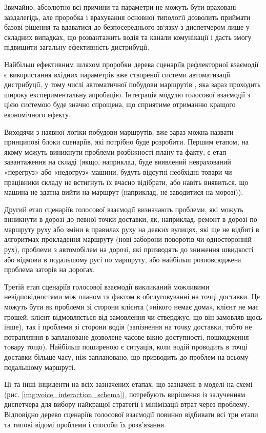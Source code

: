Звичайно, абсолютно всі причини та параметри не можуть бути враховані заздалегідь, але проробка і врахування основної типології дозволить приймати базові рішення та вдаватися до безпосереднього зв`язку з диспетчером лише у складних випадках, що розвантажить водія та канали комунікації і дасть змогу підвищити загальну ефективність дистрибуції.

Найбільш ефективним шляхом проробки дерева сценаріїв рефлекторної взаємодії є використання вхідних параметрів вже створеної системи автоматизації дистрибуції, у тому числі автоматичної побудови маршрутів \cite{as6}, яка зараз проходить широку експериментальну апробацію. Інтеграція модулю голосової взаємодії з цією системою буде значно спрощена, що сприятиме отриманню кращого економічного ефекту.

Виходячи з наявної логіки побудови маршрутів, вже зараз можна назвати принципові блоки сценаріїв, які потрібно буде розробити. Першим етапом, на якому можуть виникнути проблеми розбіжності плану та факту, є етап завантаження на складі (якщо, наприклад, буде виявлений неврахований «перегруз» або «недогруз» машини, будуть відсутні необхідні товари чи працівники складу не встигнуть їх вчасно відібрати, або навіть виявиться, що машина не здатна вийти на маршрут (наприклад, не заводитися на морозі)).

Другий етап сценаріїв голосової взаємодії визначають проблеми, які можуть виникнути в дорозі до певної точки доставки, як, наприклад, ремонт в дорозі по маршруту руху або зміни в правилах руху на деяких вулицях, які ще не відбиті в алгоритмах прокладення маршруту (нові заборони поворотів чи односторонній рух), проблеми з автомобілем на дорозі, які призводять до зниження швидкості або відмови в подальшому русі по маршруту, або найбільш розповсюджена проблема заторів на дорогах. 

Третій етап сценаріїв голосової взаємодії викликаний можливими невідповідностями між планом та фактом в обслуговуванні на точці доставки. Це можуть бути як проблеми зі сторони клієнта («нікого немає дома», клієнт не має грошей, клієнт відмовляється від замовлення чи стверджує, що він замовляв щось інше), так і проблеми зі сторони водія (запізнення на точку доставки, тобто не потрапляння в заплановане дозволене часове вікно доступності, пошкодження товару тощо). Найбільш поширеною є ситуація, коли водій проводить в точці доставки більше часу, ніж заплановано, що призводить до проблем на всьому подальшому маршруті.

Ці та інші інциденти на всіх зазначених етапах, що зазначені в моделі на схемі (рис. \ref{img:voice_interaction_schema}), потребують вирішення із залученням диспетчера для вибору найкращої стратегії і мінімізації втрат через проблему. Відповідно дерево сценаріїв голосової взаємодії повинно відбивати всі три етапи та типові відомі проблеми і способи їх розв’язання.

